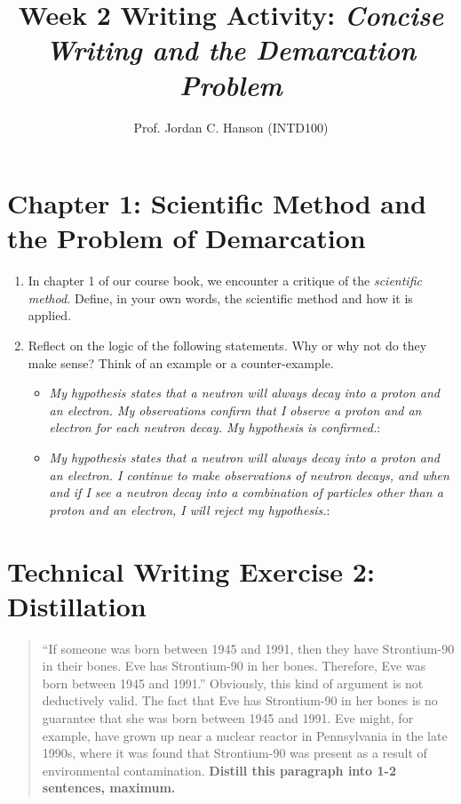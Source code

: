\documentclass{article}
\begin{document}
\title{Week 2 Writing Activity: \textit{Concise Writing and the Demarcation Problem}}
\author{Prof. Jordan C. Hanson (INTD100)}

\maketitle

\section{Chapter 1: Scientific Method and the Problem of Demarcation}

\begin{enumerate}
\item In chapter 1 of our course book, we encounter a critique of the \textit{scientific method.}  Define, in your own words, the scientific method and how it is applied.
\\
\vspace{2cm}
\item Reflect on the logic of the following statements.  Why or why not do they make sense?  Think of an example or a counter-example.
\begin{itemize}
\item \textit{My hypothesis states that a neutron will always decay into a proton and an electron.  My observations confirm that I observe a proton and an electron for each neutron decay.  My hypothesis is confirmed.}: \\ \vspace{2.5cm}
\item \textit{My hypothesis states that a neutron will always decay into a proton and an electron.  I continue to make observations of neutron decays, and when and if I see a neutron decay into a combination of particles other than a proton and an electron, I will reject my hypothesis.}: \\ \vspace{2.5cm}
\end{itemize}
\end{enumerate}

\section{Technical Writing Exercise 2: Distillation}

\begin{quotation}
``If someone was born between 1945 and 1991, then they have Strontium-90 in their bones.  Eve has Strontium-90 in her bones.  Therefore, Eve was born between 1945 and 1991.'' Obviously, this kind of argument is not deductively valid.  The fact that Eve has Strontium-90 in her bones is no guarantee that she was born between 1945 and 1991.  Eve might, for example, have grown up near a nuclear reactor in Pennsylvania in the late 1990s, where it was found that Strontium-90 was present as a result of environmental contamination.  \textbf{Distill this paragraph into 1-2 sentences, maximum.}

\end{quotation}
\end{document}
